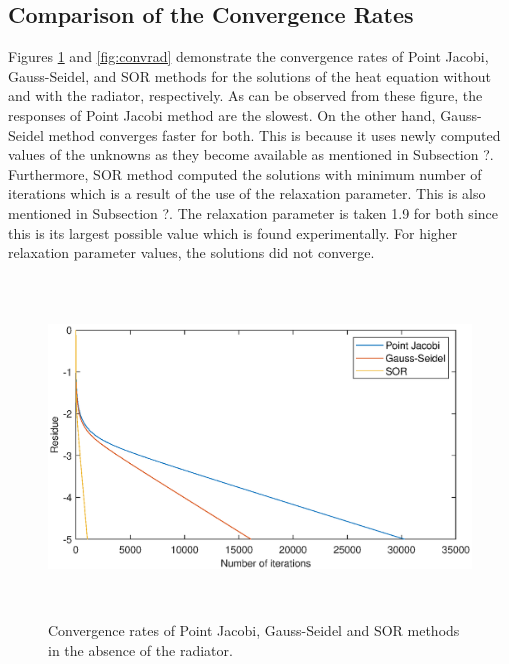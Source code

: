 \documentclass[letterpaper,12pt]{article}
\begin{document}
\subsection{Comparison of the Convergence Rates}
Figures \ref{fig:convnorad} and \ref{fig:convrad} demonstrate the convergence rates of Point
Jacobi, Gauss-Seidel, and SOR methods for the solutions of the heat equation without and with
the radiator, respectively. As can be observed from these figure, the responses of Point Jacobi
method are the slowest. On the other hand, Gauss-Seidel method converges faster for both.
This is because it uses newly computed values of the unknowns as they become available as 
mentioned in Subsection ?. Furthermore, SOR method computed the solutions with minimum number
of iterations which is a result of the use of the relaxation parameter. This is also mentioned
in Subsection ?. The relaxation parameter is taken 1.9 for both since this is its largest
possible value which is found experimentally. For higher relaxation parameter values, the
solutions did not converge.

\begin{figure}[H] 
	\centering 
	\includegraphics[max height=9cm]{graphs/residual_SOR19_norad.eps}
	\caption{Convergence rates of Point Jacobi, Gauss-Seidel and SOR methods in the absence of the radiator.}
 	\label{fig:convnorad}
\end{figure}
\end{document}
